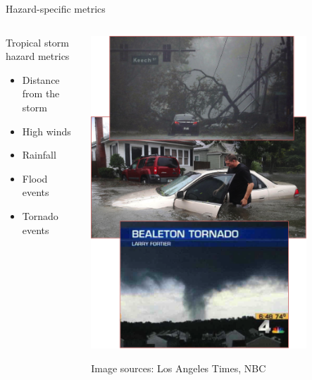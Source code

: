 \documentclass[ignorenonframetext,]{beamer}
\begin{document}
\begin{frame}{Hazard-specific metrics}

\begin{columns}
\begin{column}{0.5\textwidth}
\begin{block}{Tropical storm hazard metrics}
   \begin{itemize}
    \item Distance from the storm
    \item High winds
    \item Rainfall
    \item Flood events
    \item Tornado events
   \end{itemize}
\end{block}
\end{column}
\begin{column}{0.5\textwidth}  
    \vspace{-0.25cm}
    \begin{center}
     \includegraphics[width=0.8\textwidth]{storm_hazards.png}
     \end{center}
     \vspace{-0.25cm}
     \scriptsize{Image sources: Los Angeles Times, NBC}
\end{column}
\end{columns}

\end{frame}
\end{document}
